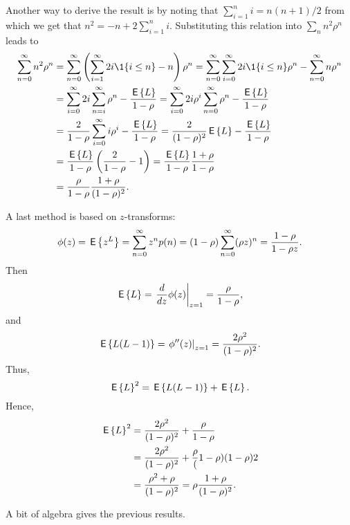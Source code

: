 \begin{exercise}
\begin{solution}
Another way to derive the result is by noting that
$\sum_{i=1}^n i= n(n+1)/2$ from which we get that
$n^2 = -n + 2\sum_{i=1}^n i$. Substituting this relation into
$\sum_n n^2 \rho^n$ leads to
\begin{equation*}
  \begin{split}
    \sum_{n=0}^\infty n^2 \rho^n 
&=    \sum_{n=0}^\infty \left(\sum_{i=1}^\infty 2i \1{i\leq n}  - n\right)\rho^n 
=    \sum_{n=0}^\infty \sum_{i=0}^\infty 2i\1{i\leq n}\rho^n  - \sum_{n=0}^\infty n\rho^n \\
&=    \sum_{i=0}^\infty 2i \sum_{n=i}^\infty \rho^n  - \frac{\E L}{1-\rho} 
=    \sum_{i=0}^\infty 2i \rho^i \sum_{n=0}^\infty \rho^n  - \frac{\E L}{1-\rho} \\
&=    \frac2{1-\rho} \sum_{i=0}^\infty i \rho^i   - \frac{\E L}{1-\rho} 
=    \frac2{(1-\rho)^2} \E L - \frac{\E L}{1-\rho} \\
&=    \frac{\E L}{1-\rho}  \left(\frac2{1-\rho}  - 1\right) 
=    \frac{\E L}{1-\rho}  \frac{1+\rho}{1-\rho} \\
&=    \frac{\rho}{1-\rho}  \frac{1+\rho}{(1-\rho)^2}.
\end{split}
\end{equation*}

A last method is based on $z$-transforms:
\begin{equation*}
  \phi(z) = \,\mathsf{E}\left\{z^L\right\} = \sum_{n=0}^\infty z^n p(n) = (1-\rho) \sum_{n=0}^\infty (\rho z)^n = \frac{1-\rho}{1-\rho z}.
\end{equation*}
Then 
\begin{equation*}
  \,\mathsf{E}\left\{L\right\} = \left.\frac d {dz} \phi(z)\right|_{z=1} = \frac{\rho}{1-\rho},
\end{equation*}
and 
\begin{equation*}
  \,\mathsf{E}\left\{L(L-1)\right\}= \left.\phi''(z)\right|_{z=1} = \frac{2\rho^2}{(1-\rho)^2}.
\end{equation*}
Thus,
\begin{equation*}
\,\mathsf{E}\left\{L\right\}^2 =   \,\mathsf{E}\left\{L(L-1)\right\} + \,\mathsf{E}\left\{L\right\}.
\end{equation*}
Hence,
\begin{equation*}
  \begin{split}
\,\mathsf{E}\left\{L\right\}^2 
&=   \frac{2\rho^2}{(1-\rho)^2} + \frac\rho{1-\rho} \\
&=   \frac{2\rho^2}{(1-\rho)^2} + \frac\rho(1-\rho){(1-\rho)2} \\
&=   \frac{\rho^2+\rho}{(1-\rho)^2} = \rho \frac{1+\rho}{(1-\rho)^2}.
  \end{split}
\end{equation*}

A bit of algebra gives the previous results.
  \end{solution}
\end{exercise}



